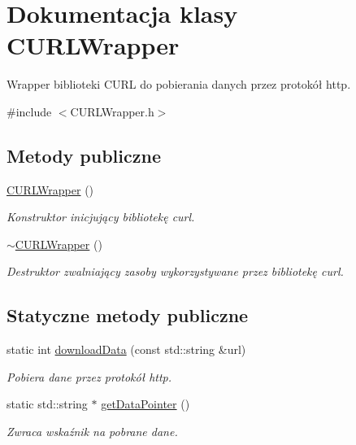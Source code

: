 \hypertarget{class_c_u_r_l_wrapper}{\section{\-Dokumentacja klasy \-C\-U\-R\-L\-Wrapper}
\label{class_c_u_r_l_wrapper}
}


\-Wrapper biblioteki \-C\-U\-R\-L do pobierania danych przez protokół http.  




{\ttfamily \#include $<$\-C\-U\-R\-L\-Wrapper.\-h$>$}

\subsection*{\-Metody publiczne}
\begin{DoxyCompactItemize}
\item 
\hyperlink{class_c_u_r_l_wrapper_a29bb6d7868fc555dd87c099f5b38a571}{\-C\-U\-R\-L\-Wrapper} ()
\begin{DoxyCompactList}\small\item\em \-Konstruktor inicjujący bibliotekę curl. \end{DoxyCompactList}\item 
\hyperlink{class_c_u_r_l_wrapper_a62ff4d4836e61952283c7ff8486a375e}{$\sim$\-C\-U\-R\-L\-Wrapper} ()
\begin{DoxyCompactList}\small\item\em \-Destruktor zwalniający zasoby wykorzystywane przez bibliotekę curl. \end{DoxyCompactList}\end{DoxyCompactItemize}
\subsection*{\-Statyczne metody publiczne}
\begin{DoxyCompactItemize}
\item 
static int \hyperlink{class_c_u_r_l_wrapper_ab30b15a7f68ca583e42a6db2f4e4f745}{download\-Data} (const std\-::string \&url)
\begin{DoxyCompactList}\small\item\em \-Pobiera dane przez protokół http. \end{DoxyCompactList}\item 
static std\-::string $\ast$ \hyperlink{class_c_u_r_l_wrapper_af73bac595dd43910a0fc63206662f8bd}{get\-Data\-Pointer} ()
\begin{DoxyCompactList}\small\item\em \-Zwraca wskaźnik na pobrane dane. \end{DoxyCompactList}\end{DoxyCompactItemize}
